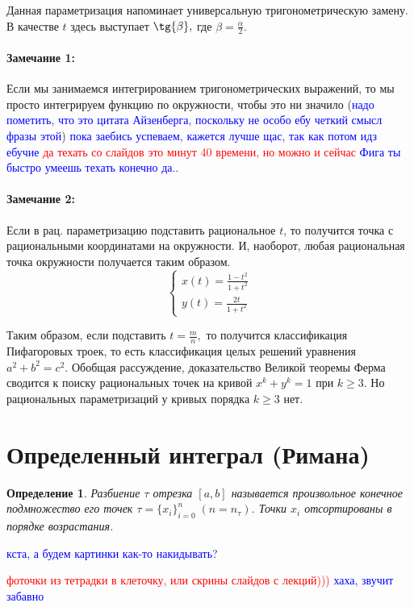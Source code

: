 \documentclass{article}
\theoremstyle{plain}
\newtheorem{definition}{Определение}
\theoremstyle{definition}
\theoremstyle{remark}
\begin{document}
Данная параметризация напоминает универсальную тригонометрическую замену. В качестве $t$ здесь выступает $\tg{\beta},$ где $\beta = \frac{\alpha}{2}.$
\paragraph{Замечание 1:} Если мы занимаемся интегрированием тригонометрических выражений, то мы просто интегрируем функцию по окружности, чтобы это ни значило (\textcolor{blue}{надо пометить, что это цитата Айзенберга, поскольку не особо ебу четкий смысл фразы этой})
\textcolor{blue}{пока заебись успеваем, кажется лучше щас, так как потом идз ебучие}
\textcolor{red}{да техать со слайдов это минут 40 времени, но можно и сейчас}
\textcolor{blue}{Фига ты быстро умеешь техать конечно да..}


\paragraph{Замечание 2:} Если в рац. параметризацию подставить рациональное $t$, то получится точка с рациональными координатами на окружности. И, наоборот, любая рациональная точка окружности получается таким образом.
\[
\left\{
\begin{aligned}
x(t) =  \frac{1 - t^2}{1 + t^2}\\
y(t) = \frac{2t}{1 + t^2}
\end{aligned}
\right.
\]

Таким образом, если подставить $t = \frac{m}{n},$ то получится классификация Пифагоровых троек, то есть классификация целых решений уравнения $a^2 + b^2 = c^2.$ Обобщая рассуждение, доказательство Великой теоремы Ферма сводится к поиску рациональных точек на кривой $x^k + y^k = 1$ при $k \geq 3.$ Но рациональных параметризаций у кривых порядка $k \geq 3$ нет.

\section{Определенный интеграл (Римана)}


\begin{definition}
Разбиение $\tau$ отрезка $[a, b]$ называется произвольное конечное подмножество его точек $\tau = \{x_i\}_{i=0}^{n}\;(n=n_{\tau})$. Точки $x_i$ отсортированы в порядке возрастания.
\end{definition}
\textcolor{blue}{кста, а будем картинки как-то накидывать?}

\textcolor{red}{фоточки из тетрадки в клеточку, или скрины слайдов с лекций)))}
\textcolor{blue}{хаха, звучит забавно}
\end{document}
